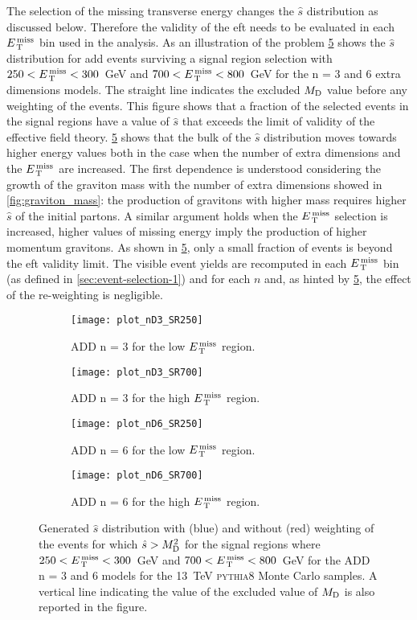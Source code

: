 The selection of the missing transverse energy changes the $\hat{s}$
distribution as discussed below. Therefore the validity of the \gls{eft} needs
to be evaluated in each $E_\mathrm{\, T}^\mathrm{\, miss}$ bin used in the analysis. As an illustration of
the problem \cref{fig:shat} shows the $\hat{s}$ distribution for \gls{add}
events surviving a signal region selection with $250 < E_\mathrm{\, T}^\mathrm{\, miss} < 300$~GeV and
$700 < E_\mathrm{\, T}^\mathrm{\, miss} < 800$~GeV for the n = 3 and 6 extra dimensions models. The straight
line indicates the excluded $M_\mathrm{D}$ value before any weighting of the events. This
figure shows that a fraction of the selected events in the signal regions have a
value of $\hat{s}$ that exceeds the limit of validity of the effective field
theory. \cref{fig:shat} shows that the bulk of the $\hat{s}$ distribution moves
towards higher energy values both in the case when the number of extra
dimensions and the $E_\mathrm{\, T}^\mathrm{\, miss}$ are increased. The first dependence is understood
considering the growth of the graviton mass with the number of extra dimensions
showed in \cref{fig:graviton_mass}: the production of gravitons with higher mass
requires higher $\hat{s}$ of the initial partons. A similar argument holds when
the $E_\mathrm{\, T}^\mathrm{\, miss}$ selection is increased, higher values of missing energy imply the
production of higher momentum gravitons. As shown in \cref{fig:shat}, only a
small fraction of events is beyond the \gls{eft} validity limit. The visible
event yields are recomputed in each $E_\mathrm{\, T}^\mathrm{\, miss}$ bin (as defined in
\cref{sec:event-selection-1}) and for each $n$ and, as hinted by
\cref{fig:shat}, the effect of the re-weighting is negligible.
\begin{figure}[!htb]
  \centering
  \begin{subfigure}{.48\linewidth}
    \texttt{[image: plot\_nD3\_SR250]}
    \caption{ADD n = 3 for the low $E_\mathrm{\, T}^\mathrm{\, miss}$ region.}
    \label{fig:shat_n3_250}
  \end{subfigure}
  \begin{subfigure}{.48\linewidth}
    \texttt{[image: plot\_nD3\_SR700]}
    \caption{ADD n = 3 for the high $E_\mathrm{\, T}^\mathrm{\, miss}$ region.}
    \label{fig:shat_n3_700}
  \end{subfigure}
  \begin{subfigure}{.48\linewidth}
    \texttt{[image: plot\_nD6\_SR250]}
    \caption{ADD n = 6 for the low $E_\mathrm{\, T}^\mathrm{\, miss}$ region.}
    \label{fig:shat_n6_250}
  \end{subfigure}
  \begin{subfigure}{.48\linewidth}
    \texttt{[image: plot\_nD6\_SR700]}
    \caption{ADD n = 6 for the high $E_\mathrm{\, T}^\mathrm{\, miss}$ region.}
    \label{fig:shat_n6_700}
  \end{subfigure}
  \caption{Generated $\hat{s}$ distribution with (blue) and without (red)
    weighting of the events for which $\hat{s} > M_\mathrm{D}^2$ for the signal regions
    where $250 < E_\mathrm{\, T}^\mathrm{\, miss} < 300$~GeV and $700 < E_\mathrm{\, T}^\mathrm{\, miss} < 800$~GeV for the ADD n = 3
    and 6 models for the 13~TeV \textsc{pythia8} Monte Carlo samples. A vertical
    line indicating the value of the excluded value of $M_\mathrm{D}$ is also reported in
    the figure.}
  \label{fig:shat}
\end{figure}
